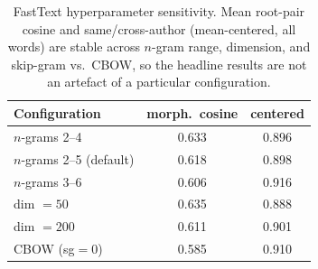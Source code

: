 \begin{table}[t]
  \centering
  \begin{tabular}{lcc}
    \toprule
    \textbf{Configuration} & \textbf{morph.\ cosine} & \textbf{centered \auc{}} \\
    \midrule
    $n$-grams 2--4          & 0.633 & 0.896 \\
    $n$-grams 2--5 (default) & 0.618 & 0.898 \\
    $n$-grams 3--6          & 0.606 & 0.916 \\
    dim $=50$               & 0.635 & 0.888 \\
    dim $=200$              & 0.611 & 0.901 \\
    CBOW (sg$=0$)           & 0.585 & 0.910 \\
    \bottomrule
  \end{tabular}
  \caption{FastText hyperparameter sensitivity. Mean root-pair cosine and
  same/cross-author \auc{} (mean-centered, all words) are stable across $n$-gram
  range, dimension, and skip-gram vs.\ CBOW, so the headline results are not an
  artefact of a particular configuration.}
  \label{tab:hyper}
\end{table}
